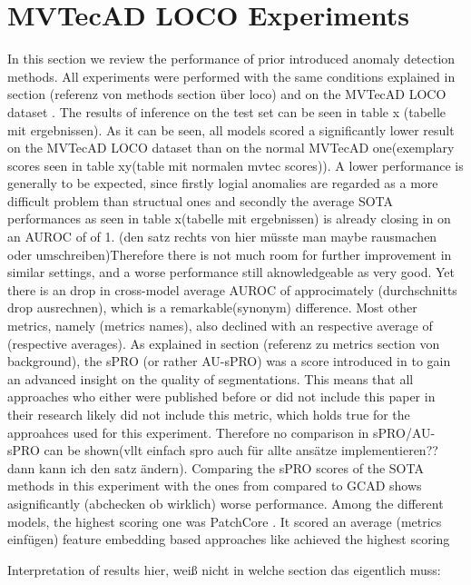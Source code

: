 \section{MVTecAD LOCO Experiments}
\label{sec:locoxperiments}
In this section we review the performance of prior introduced anomaly detection methods. All experiments were performed with the same 
conditions explained in section (referenz von methods section über loco) 
and on the MVTecAD LOCO dataset \cite{LOCODentsAndScratchesBergmann2022}. 
The results of inference on the test set can be seen in table x (tabelle mit ergebnissen). As it can be seen, all models scored a significantly 
lower result on the MVTecAD LOCO dataset than on the normal MVTecAD one(exemplary scores seen in table xy(table mit normalen mvtec scores)). 
A lower performance is generally to be expected, since firstly logial anomalies are regarded as a more difficult problem than structual 
ones and secondly the average SOTA performances as seen in table x(tabelle mit ergebnissen) is already closing in on an AUROC of of 1. 
(den satz rechts von hier müsste man maybe rausmachen oder umschreiben)Therefore there is not much room for further improvement in similar settings, and a worse performance still aknowledgeable as very good. 
Yet there is an drop in cross-model average AUROC of approcimately (durchschnitts drop ausrechnen), which is a remarkable(synonym) difference. 
Most other metrics, namely (metrics names), also declined with an respective average of (respective averages). As explained in section 
(referenz zu metrics section von background), the sPRO (or rather AU-sPRO) was a score introduced in \cite{LOCODentsAndScratchesBergmann2022} to gain an 
advanced insight on the quality of segmentations. This means that all approaches who either were published before or did not include this 
paper in their research likely did not include this metric, which holds true for the approahces used for this experiment. Therefore no comparison 
in sPRO/AU-sPRO can be shown(vllt einfach spro auch für allte ansätze implementieren?? dann kann ich den satz ändern). Comparing the sPRO 
scores of the SOTA methods in this experiment with the ones from compared to GCAD \cite{LOCODentsAndScratchesBergmann2022} shows asignificantly 
(abchecken ob wirklich) worse performance.
Among the different models, the highest scoring one was PatchCore \cite{patchCore2022}. It scored an average (metrics einfügen) feature embedding based approaches like  
achieved the highest scoring

Interpretation of results hier, weiß nicht in welche section das eigentlich muss:


